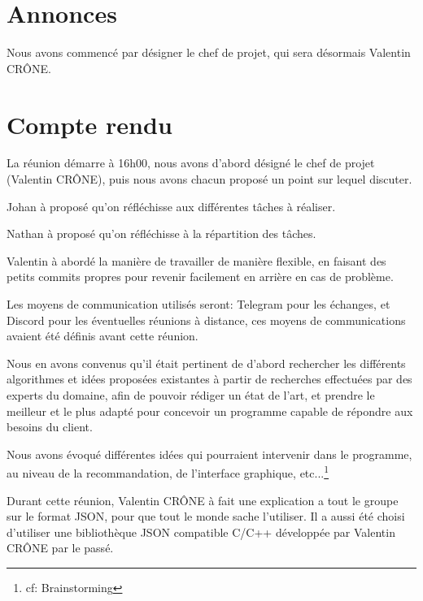 \documentclass[11pt]{meetingmins}
\begin{document}
\maketitle

\section{Annonces}

\begin{hiddenitems}
	\item Nous avons commencé par désigner le chef de projet, qui sera désormais Valentin CRÔNE.
\end{hiddenitems}

\section {Compte rendu}
\begin{flushleft}
	La réunion démarre à 16h00, nous avons d'abord désigné le chef de projet (Valentin CRÔNE), puis nous avons chacun proposé un point sur lequel discuter.
	\begin{items}
		\item Johan à proposé qu'on réfléchisse aux différentes tâches à réaliser.
		\item Nathan à proposé qu'on réfléchisse à la répartition des tâches.
		\item Valentin à abordé la manière de travailler de manière flexible, en faisant des petits commits propres pour revenir facilement en arrière en cas de problème.
	\end{items}
	Les moyens de communication utilisés seront: Telegram pour les échanges, et Discord pour les éventuelles réunions à distance, ces moyens de communications avaient été définis avant cette réunion.\par


	Nous en avons convenus qu'il était pertinent de d'abord rechercher les différents algorithmes et idées proposées existantes à partir de recherches effectuées par des experts du domaine, afin de pouvoir rédiger un état de l'art, et prendre le meilleur et le plus adapté pour concevoir un programme capable de répondre aux besoins du client.
	\par
	Nous avons évoqué différentes idées qui pourraient intervenir dans le programme, au niveau de la recommandation, de l'interface graphique, etc...\footnote{cf: Brainstorming}

	\par
	Durant cette réunion, Valentin CRÔNE à fait une explication a tout le groupe sur le format JSON, pour que tout le monde sache l'utiliser. Il a aussi été choisi d'utiliser une bibliothèque JSON compatible C/C++ développée par Valentin CRÔNE par le passé.
\end{flushleft}
\end{document}
